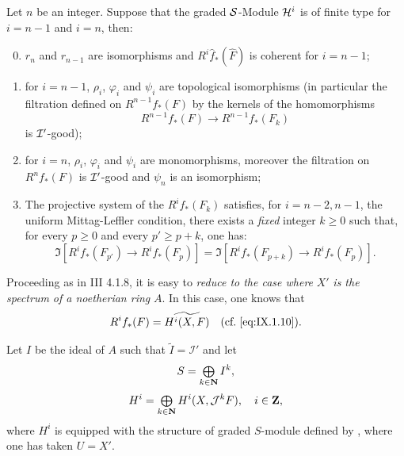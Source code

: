 \begin{theorem} \label{IX.1.1} \setcounter{equation}{11}
Let $n$ be an integer. Suppose that the graded ${\mathcal S}$-Module ${\mathcal H}^i$ is of finite type for $i=n-1$ and $i=n$, then:
\begin{enumerate}\setcounter{enumi}{-1}
\item
$r_n$ and $r_{n-1}$ are isomorphisms and $R^i\hat{f}_*(\hat{F})$ is coherent for $i=n-1$;
\item
for $i=n-1$, $\rho_i$, $\varphi_i$ and $\psi_i$ are topological isomorphisms (in particular the filtration defined on $R^{n-1}f_*(F)$ by the kernels of the homomorphisms
\begin{equation} \label{eq:IX.1.12}
R^{n-1}f_*(F) \to R^{n-1}f_*(F_k)
\end{equation}
is ${\mathcal I}'$-good);

\item
for $i=n$, $\rho_i$, $\varphi_i$ and $\psi_i$ are monomorphisms, moreover the filtration on $R^n f_*(F)$ is ${\mathcal I}'$-good and $\psi_n$ is an isomorphism;

\item
The projective system of the $R^i f_*(F_k)$ satisfies, for $i=n-2, n-1$, the uniform Mittag-Leffler condition, \ie there exists a \emph{fixed} integer $k\geq 0$ such that, for every $p\geq 0$ and every $p'\geq p+k$, one has:
\begin{equation*}
\Im[R^i f_*(F_{p'})\to R^i f_*(F_p)]=\Im[R^i f_*(F_{p+k})\to R^i f_*(F_p)].
\end{equation*}
\end{enumerate}
\end{theorem}

Proceeding as in \EGA III 4.1.8, it is easy to \emph{reduce to the case where} $X'$ \emph{is the spectrum of a noetherian ring} $A$. In this case, one knows that
\begin{equation} \label{eq:IX.1.13} R^if_*(F)=\widetilde{H^i(X, F)} \quad \text{(\cf \Ref{eq:IX.1.10}).}
\end{equation}

Let $I$ be the ideal of $A$ such that $\tilde{I}=\mathcal I'$ and let
\begin{equation} \label{eq:IX.1.14}
S=\mathop{\textstyle\bigoplus}\limits_{k \in \mathbf{N}}I^k,
\end{equation}
\begin{equation} \label{eq:IX.1.15}
H^i=\mathop{\textstyle\bigoplus}\limits_{k \in \mathbf{N}}H^i(X, {\mathcal{J}}^k F), \quad i \in \mathbf{Z},
\end{equation}
where $H^i$ is equipped with the structure of graded $S$-module defined by , where one has taken $U=X'$.

